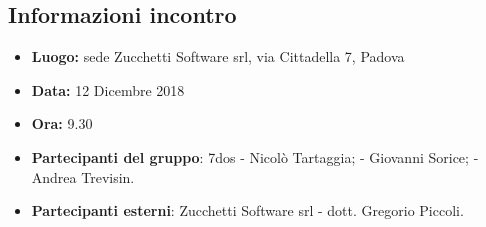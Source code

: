 \subsection{Informazioni incontro}
\begin{itemize}
	\item { \textbf{Luogo:} sede Zucchetti Software srl, via Cittadella 7, Padova}
	\item { \textbf{Data:} 12 Dicembre 2018 }
	\item { \textbf{Ora:} 9.30 }
	\item { \textbf{Partecipanti del gruppo}:  7dos 
		 	\newline - Nicolò Tartaggia; 
		 	\newline - Giovanni Sorice;
		 	\newline - Andrea Trevisin.   		  
	 	 }
	\item { \textbf{Partecipanti esterni}:  Zucchetti Software srl
		 \newline - dott. Gregorio Piccoli.
		 }
\end{itemize}


